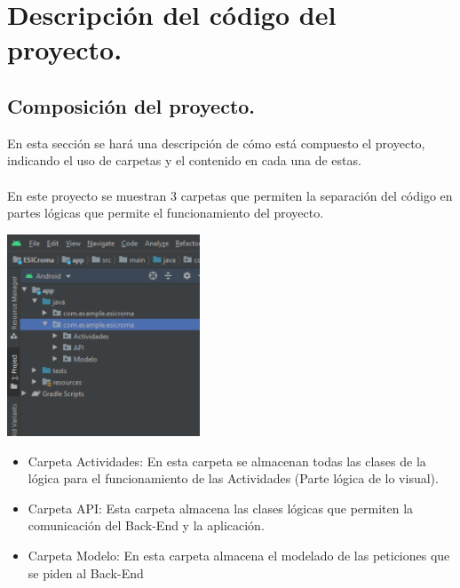 \section{Descripción del código del proyecto.}

\subsection{Composición del proyecto.}
En esta sección se hará una descripción de cómo está compuesto el proyecto, indicando el uso de 
carpetas y el contenido en cada una de estas.
\\\\
En este proyecto se muestran 3 carpetas que permiten la separación del código en partes lógicas que
permite el funcionamiento del proyecto.


\begin{multicols}{2}
    \includegraphics[width=0.43\textwidth]{Imagen/Android.png}
    
    \begin{itemize}
        \item Carpeta Actividades: En esta carpeta se almacenan todas las clases de la lógica para el 
        funcionamiento de las Actividades (Parte lógica de lo visual).
        \item Carpeta API: Esta carpeta almacena las clases lógicas que permiten la comunicación del 
        Back-End y la aplicación.
        \item Carpeta Modelo: En esta carpeta almacena el modelado de las peticiones que se piden al Back-End
    \end{itemize}
\end{multicols}


